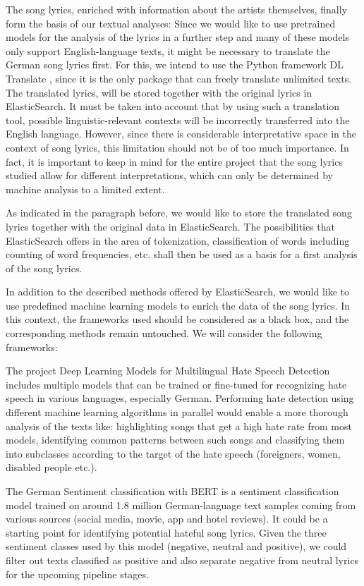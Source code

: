The song lyrics, enriched with information about the artists themselves, finally form the basis of our textual analyses: Since we would like to use pretrained models for the analysis of the lyrics in a further step and many of these models only support English-language texts, it might be necessary to translate the German song lyrics first. For this, we intend to use the Python framework DL Translate \cite{lu_2022}, since it is the only package that can freely translate unlimited texts. The translated lyrics, will be stored together with the original lyrics in ElasticSearch. It must be taken into account that by using such a translation tool, possible linguistic-relevant contexts will be incorrectly transferred into the English language. However, since there is considerable interpretative space in the context of song lyrics, this limitation should not be of too much importance. In fact, it is important to keep in mind for the entire project that the song lyrics studied allow for different interpretations, which can only be determined by machine analysis to a limited extent.

As indicated in the paragraph before, we would like to store the translated song lyrics together with the original data in ElasticSearch. The possibilities that ElasticSearch offers in the area of tokenization, classification of words including counting of word frequencies, etc. shall then be used as a basis for a first analysis of the song lyrics.

In addition to the described methods offered by ElasticSearch, we would like to use predefined machine learning models to enrich the data of the song lyrics. In this context, the frameworks used should be considered as a black box, and the corresponding methods remain untouched. We will consider the following frameworks:

The project Deep Learning Models for Multilingual Hate Speech Detection \cite{deepMLhatespeech} includes multiple models that can be trained or fine-tuned for recognizing hate speech in various languages, especially German. Performing hate detection using different machine learning algorithms in parallel would enable a more thorough analysis of the texts like: highlighting songs that get a high hate rate from most models, identifying common patterns between such songs and classifying them into subclasses according to the target of the hate speech (foreigners, women, disabled people etc.).

The German Sentiment classification with BERT \cite{guhr2020training} is a sentiment classification model trained on around 1.8 million German-language text samples coming from various sources (social media, movie, app and hotel reviews). It could be a starting point for identifying potential hateful song lyrics. Given the three sentiment classes used by this model (negative, neutral and positive), we could filter out texts classified as positive and also separate negative from neutral lyrics for the upcoming pipeline stages.

